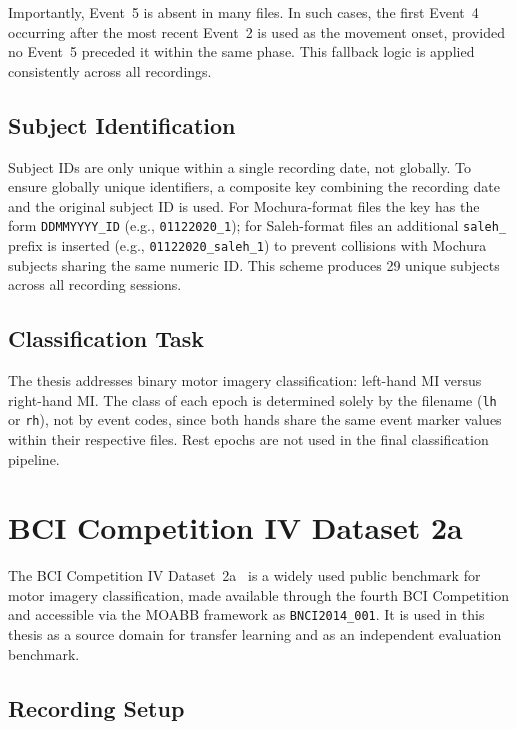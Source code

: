 \documentclass[english, bc, kiv, he, iso690alph, pdf]{fasthesis}
\begin{document}
Importantly, Event~5 is absent in many files. In such cases, the first Event~4 occurring after the most recent Event~2 is used as the movement onset, provided no Event~5 preceded it within the same phase. This fallback logic is applied consistently across all recordings.

\subsection{Subject Identification}

Subject IDs are only unique within a single recording date, not globally. To ensure globally unique identifiers, a composite key combining the recording date and the original subject ID is used. For Mochura-format files the key has the form \texttt{DDMMYYYY\_ID} (e.g., \texttt{01122020\_1}); for Saleh-format files an additional \texttt{saleh\_} prefix is inserted (e.g., \texttt{01122020\_saleh\_1}) to prevent collisions with Mochura subjects sharing the same numeric ID. This scheme produces 29 unique subjects across all recording sessions.

\subsection{Classification Task}

The thesis addresses binary motor imagery classification: left-hand MI versus right-hand MI. The class of each epoch is determined solely by the filename (\texttt{lh} or \texttt{rh}), not by event codes, since both hands share the same event marker values within their respective files. Rest epochs are not used in the final classification pipeline.

\section{BCI Competition IV Dataset 2a}

The BCI Competition IV Dataset~2a~\cite{brunner2008bci} is a widely used public benchmark for motor imagery classification, made available through the fourth BCI Competition and accessible via the MOABB framework as \texttt{BNCI2014\_001}. It is used in this thesis as a source domain for transfer learning and as an independent evaluation benchmark.

\subsection{Recording Setup}
\end{document}
